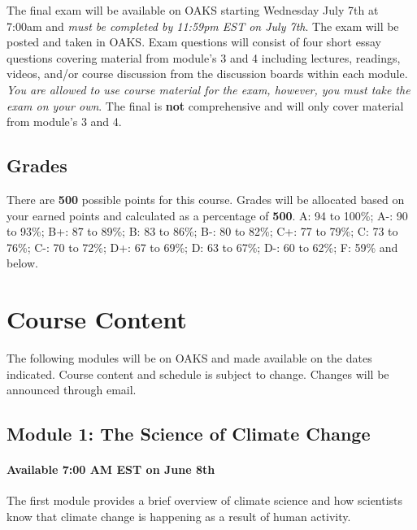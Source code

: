 The final exam will be available on OAKS starting Wednesday July 7th at
7:00am and \emph{must be completed by 11:59pm EST on July 7th}. The exam
will be posted and taken in OAKS. Exam questions will consist of four
short essay questions covering material from module's 3 and 4 including
lectures, readings, videos, and/or course discussion from the discussion
boards within each module. \emph{You are allowed to use course material
for the exam, however, you must take the exam on your own}. The final is
\textbf{not} comprehensive and will only cover material from module's 3
and 4.

\hypertarget{grades}{%
\subsection{Grades}\label{grades}}

There are \textbf{500} possible points for this course. Grades will be
allocated based on your earned points and calculated as a percentage of
\textbf{500}. A: 94 to 100\%; A-: 90 to 93\%; B+: 87 to 89\%; B: 83 to
86\%; B-: 80 to 82\%; C+: 77 to 79\%; C: 73 to 76\%; C-: 70 to 72\%; D+:
67 to 69\%; D: 63 to 67\%; D-: 60 to 62\%; F: 59\% and below.

\hypertarget{course-content}{%
\section{Course Content}\label{course-content}}

The following modules will be on OAKS and made available on the dates
indicated. Course content and schedule is subject to change. Changes
will be announced through email.

\hypertarget{module-1-the-science-of-climate-change}{%
\subsection{Module 1: The Science of Climate
Change}\label{module-1-the-science-of-climate-change}}

\hypertarget{available-700-am-est-on-june-8th}{%
\paragraph{Available 7:00 AM EST on June
8th}\label{available-700-am-est-on-june-8th}}

The first module provides a brief overview of climate science and how
scientists know that climate change is happening as a result of human
activity.

